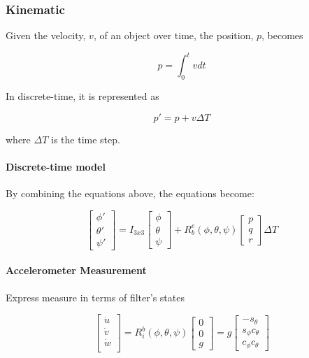 \documentclass[]{article}
\begin{document}
\subsubsection{Kinematic}
Given the velocity, $v$, of an object over time, the position, $p$, becomes

\begin{equation}
p = \int_0^t v dt
\end{equation}

In discrete-time, it is represented as

\begin{equation}
p' = p + v \Delta T
\end{equation}

where $\Delta T$ is the time step.


\paragraph*{Discrete-time model}
By combining the equations above, the equations become:

\begin{equation}
\begin{bmatrix}
\phi' \\
\theta' \\
\psi'
\end{bmatrix} = I_{3x3} 
\begin{bmatrix}
\phi \\
\theta \\
\psi
\end{bmatrix} + 
R_b^e(\phi, \theta, \psi)
\begin{bmatrix}
p \\
q \\
r
\end{bmatrix}
\Delta T
\end{equation}

\paragraph{Accelerometer Measurement}
Express measure in terms of filter's states

\begin{equation}
\begin{bmatrix}
\dot{u} \\
\dot{v} \\
\dot{w} \\
\end{bmatrix} = 
R_{i}^{b}(\phi, \theta, \psi)
\begin{bmatrix}
0 \\
0 \\
g
\end{bmatrix} = g
\begin{bmatrix}
-s_\theta \\
s_\phi c_\theta \\
c_\phi c_\theta
\end{bmatrix}\label{eqn:accelerometer_measurement_equation}
\end{equation}
\end{document}
